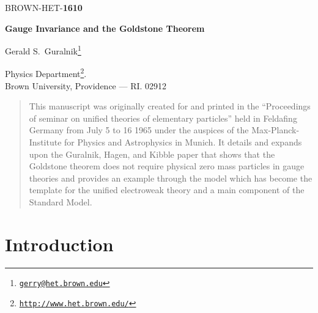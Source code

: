 \documentclass[%
  12pt,
  paper=letter,
  abstracton,
  pagesize=auto,
  version=last,
  DIV=calc
  ]{article}
\def\textsf{}
\begin{document}
%
\begin{flushright}
  {\textsf{BROWN-HET-\textbf{1610}}}
\end{flushright}
\bigskip

\begin{center}
  {\Large \textbf{\textsf{Gauge Invariance and the Goldstone Theorem}}} \\
  \vspace{0.75in}

  {\Large \textsf{Gerald S.~Guralnik\footnote{\href{mailto:gerry@het.brown.edu}{\texttt{gerry@het.brown.edu}}}}} \\
  \bigskip\bigskip

  \textsf{Physics Department\footnote{\href{http://www.het.brown.edu/}{\texttt{http://www.het.brown.edu/}}}.}\\

  \textsf{Brown University, Providence --- RI. 02912}
\end{center}
\bigskip\bigskip\bigskip

\begin{abstract}
\noindent This manuscript was originally created for and printed in the
``Proceedings of seminar on unified theories of elementary particles''
held in Feldafing Germany from July 5 to 16 1965 under the auspices
of the Max-Planck-Institute for Physics and Astrophysics in
Munich. It details and expands upon the Guralnik, Hagen, and Kibble
paper that shows that the Goldstone theorem does not require
physical zero mass particles in gauge theories and provides an example through the model which has
become the template for the unified electroweak theory and a main component of the Standard Model.
\end{abstract}


\newpage
\section{Introduction}
\end{document}
